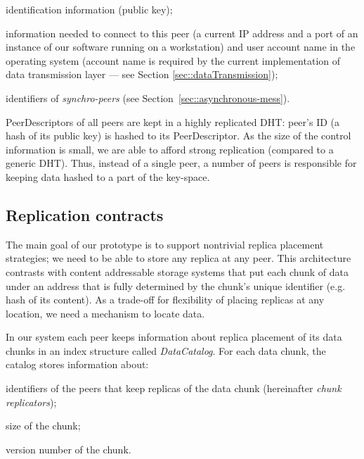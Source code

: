 \documentclass[10pt, final, conference, letterpaper]{IEEEtran}
\begin{document}
\begin{list}{}{\setlength{\leftmargin}{8pt} \setlength{\labelwidth}{0pt}}
        \setlength{\itemsep}{2pt}

\item identification information (public key); 

\item information needed to connect to this peer (a current IP address and a port of an instance of our software running on a workstation) and user account name in the operating system (account name is required by the current implementation of data transmission layer --- see Section \ref{sec::dataTransmission});

\item identifiers of \emph{synchro-peers} (see Section~\ref{sec::asynchronous-mess}). 
\end{list}

PeerDescriptors of all peers are kept in a highly replicated DHT: peer's ID (a hash of its public key) is hashed to its PeerDescriptor. 
As the size of the control information is small, we are able to afford strong replication (compared to a generic DHT). 
Thus, instead of a single peer, a number of peers is responsible for keeping data hashed to a part of the key-space.

\subsection{Replication contracts}\label{sec::catalog}
The main goal of our prototype is to support nontrivial replica placement strategies; we need to be able to store any replica at any peer. 
This architecture contrasts with content addressable storage systems that put each chunk of data under an address that is fully determined by the chunk's unique identifier (e.g. hash of its content).
As a trade-off for flexibility of placing replicas at any location, we need a mechanism to locate data.

In our system each peer keeps information about replica placement of its data chunks in an index structure called \textit{DataCatalog}.  
For each data chunk, the catalog stores information about:
\begin{inparaenum}[(i)]
\item identifiers of the peers that keep replicas of the data chunk (hereinafter \textit{chunk replicators});
\item size of the chunk;
\item version number of the chunk.
\end{inparaenum}
\end{document}
